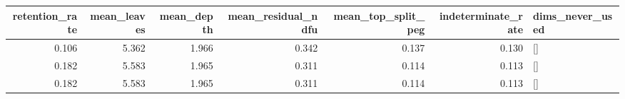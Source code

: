 \begin{tabular}{rrrrrrl}
\toprule
retention_rate & mean_leaves & mean_depth & mean_residual_ndfu & mean_top_split_peg & indeterminate_rate & dims_never_used \\
\midrule
0.106 & 5.362 & 1.966 & 0.342 & 0.137 & 0.130 & [] \\
0.182 & 5.583 & 1.965 & 0.311 & 0.114 & 0.113 & [] \\
0.182 & 5.583 & 1.965 & 0.311 & 0.114 & 0.113 & [] \\
\bottomrule
\end{tabular}
